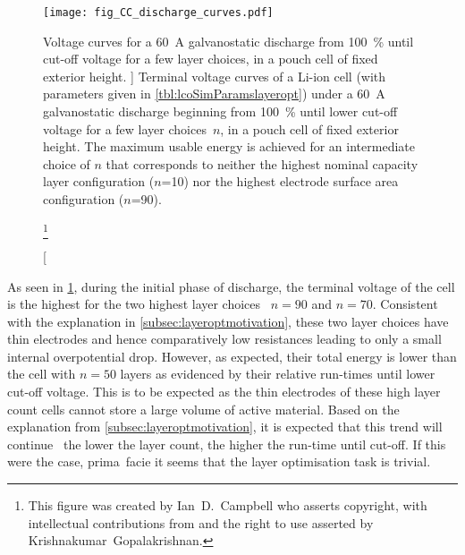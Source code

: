 

\begin{figure}[!bp]
    \begin{minipage}[t]{\textwidth}
        \centering
        \texttt{[image: fig\_CC\_discharge\_curves.pdf]}
        \captionsetup{labelsep=note}
        \caption
        [%
        Voltage curves for a \SI{60}{\ampere} galvanostatic discharge from
        \SI{100}{\percent}  until cut-off voltage for a few layer
        choices, in a pouch cell of fixed exterior height.
        ]%
        {%
            Terminal voltage curves of a Li-ion cell (with parameters
            given in \cref{tbl:lcoSimParamslayeropt}) under a \SI{60}{\ampere}
            galvanostatic discharge beginning from \SI{100}{\percent}
             until lower cut-off voltage for a few layer
            choices~$n$, in a pouch cell of fixed exterior height. The maximum
            usable energy is achieved for an intermediate choice of $n$
            that corresponds to neither the highest nominal capacity layer
            configuration ($n$=\num{10}) nor the highest electrode surface area
            configuration ($n$=\num{90}).
        }%
        \label{fig:fig_CC_discharge_curves}
        \mpfootnotes[1]

        \footnote{This figure was created by \mbox{Ian D.\ Campbell} who asserts copyright,
            with intellectual contributions from and the right to use asserted by
        \mbox{Krishnakumar Gopalakrishnan}.}
    \end{minipage}
\end{figure}

As  seen  in \cref{fig:fig_CC_discharge_curves},  during  the  initial phase  of
discharge, the terminal voltage  of the cell is the highest  for the two highest
layer  choices \ie~$n  =  90$ and  $n=70$. Consistent  with  the explanation  in
\cref{subsec:layeroptmotivation}, these  two layer choices have  thin electrodes
and  hence  comparatively low  resistances  leading  to  only a  small  internal
overpotential drop. However,  as expected, their total energy is  lower than the
cell with  $n=50$ layers as  evidenced by  their relative run-times  until lower
cut-off voltage.  This is to  be expected as the  thin electrodes of  these high
layer count cells cannot  store a large volume of active  material. Based on the
explanation  from \cref{subsec:layeroptmotivation},  it  is  expected that  this
trend will continue \ie~the lower the layer count, the higher the run-time until
cut-off. If this were the case, prima~facie it seems that the layer optimisation
task is trivial.

